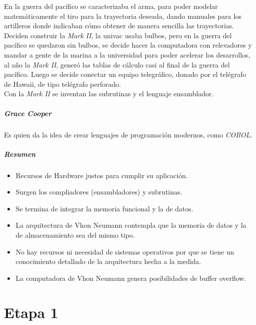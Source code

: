 En la guerra del pac\'{i}fico se caracterizaba el arma, para poder modelar matem\'{a}ticamente el tiro para la trayectoria deseada, dando manuales para los artilleros donde indicaban c\'{o}mo obtener de manera sencilla las trayectorias.\\
Deciden construir la \textit{Mark II}, la univac usaba bulbos, pero en la guerra del pac\'{i}fico se quedaron sin bulbos, se decide hacer la computadora con relevadores y mandar a gente de la marina a la universidad para poder acelerar los desarrollos, al a\~{n}o la \textit{Mark II}, gener\'{o} las tablas de c\'{a}lculo casi al final de la guerra del pac\'{i}fico.
Luego se decide conectar un equipo telegr\'{a}fico, donado por el tel\'{e}grafo de Hawaii, de tipo tel\'{e}grafo perforado.\\
Con la \textit{Mark II} se inventan las subrutinas y el lenguaje ensamblador.
\paragraph{Grace Cooper} Es quien da la idea de crear lenguajes de programaci\'{o}n modernos, como \textit{COBOL}.\\

\paragraph{Resumen}
\begin{itemize}
	\item Recursos de Hardware justos para cumplir su aplicaci\'{o}n.
	\item Surgen los compliadores (ensambladores) y subrutinas.
	\item Se termina de integrar la memoria funcional y la de datos.
	\item La arquitectura de Vhon Neumann contempla que la memoria de datos y la de almacenamiento sea del mismo tipo.
	\item No hay recursos ni necesidad de sistemas operativos por que se tiene un conocimiento detallado de la arquitectura hecha a la medida.
	\item La computadora de Vhon Neumann genera posibilidades de buffer overflow.
\end{itemize}

\chapter{Etapa 1}

